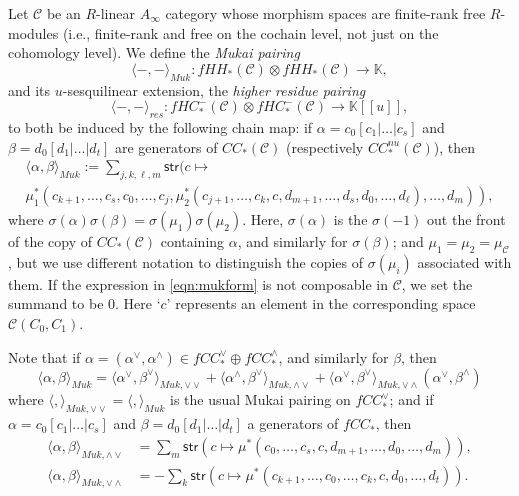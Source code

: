\documentclass{article}
\def\BbK{\mathbb{K}}
\def\cC{\mathcal{C}}
\begin{document}
Let $\cC$ be an $R$-linear $A_\infty$ category whose morphism spaces are finite-rank free $R$-modules (i.e., finite-rank and free on the cochain level, not just on the cohomology level). 
We define the \emph{Mukai pairing}  
$$\langle -,-\rangle_{Muk}: fHH_*(\cC) \otimes fHH_*(\cC) \to \BbK,$$
and its $u$-sesquilinear extension, the \emph{higher residue pairing}
$$\langle - ,-\rangle_{res}: fHC_*^-(\cC) \otimes fHC_*^-(\cC) \to \BbK[[u]],$$
to both be induced by the following chain map: if $\alpha = c_0[c_1|\ldots|c_s]$ and $\beta = d_0[d_1|\ldots|d_t]$ are generators of $CC_*(\cC)$ (respectively $CC_*^{nu}(\cC)$), then
\begin{multline}
\label{eqn:mukform}
 \langle \alpha,\beta \rangle_{Muk} := \sum_{j,k,\ell,m}\mathsf{str} (c \mapsto \\
 \left. \mu_1^*(c_{k+1},\ldots,c_s,c_0,\ldots,c_j,\mu_2^*(c_{j+1},\ldots,c_k,c,d_{m+1},\ldots,d_s,d_0,\ldots,d_\ell),\ldots,d_m) \right),
 \end{multline}
 where $\sigma(\alpha) \sigma(\beta) = \sigma(\mu_1)\sigma(\mu_2)$. Here, $\sigma(\alpha)$ is the $\sigma(-1)$ out the front of the copy of $CC_*(\cC)$ containing $\alpha$, and similarly for $\sigma(\beta)$; and $\mu_1 = \mu_2 = \mu_\cC$, but we use different notation to distinguish the copies of $\sigma(\mu_i)$ associated with them. 
If the expression in \eqref{eqn:mukform} is not composable in $\cC$, we set the summand to be $0$. 
Here `$c$' represents an element in the corresponding space $\cC(C_0,C_1)$. 

Note that if $\alpha = (\alpha^\vee,\alpha^\wedge) \in fCC^{\vee}_* \oplus fCC^{\wedge}_*$, and similarly for $\beta$, then 
\begin{equation}
    \langle \alpha,\beta \rangle_{Muk} = \langle \alpha^\vee,\beta^\vee \rangle_{Muk,\vee\vee} + \langle \alpha^\wedge,\beta^\vee \rangle_{Muk,\wedge\vee} + \langle \alpha^\vee,\beta^\vee \rangle_{Muk,\vee\wedge}(\alpha^\vee,\beta^\wedge)
\end{equation}
where $\langle,\rangle_{Muk,\vee\vee} = \langle,\rangle_{Muk}$ is the usual Mukai pairing on $fCC^{\vee}_*$; and if $\alpha = c_0[c_1|\ldots|c_s]$ and $\beta = d_0[d_1|\ldots|d_t]$ a generators of $fCC_*$, then
\begin{align*} 
\langle \alpha,\beta \rangle_{Muk,\wedge\vee} &= \sum_{m} \mathsf{str}(c \mapsto \mu^*(c_0,\ldots,c_s,c,d_{m+1},\ldots,d_0,\ldots,d_m)),\\
\langle \alpha,\beta \rangle_{Muk,\vee\wedge} &= - \sum_k \mathsf{str}(c \mapsto \mu^*(c_{k+1},\ldots,c_0,\ldots,c_k,c,d_0,\ldots,d_t)).\\
\end{align*}
\end{document}
